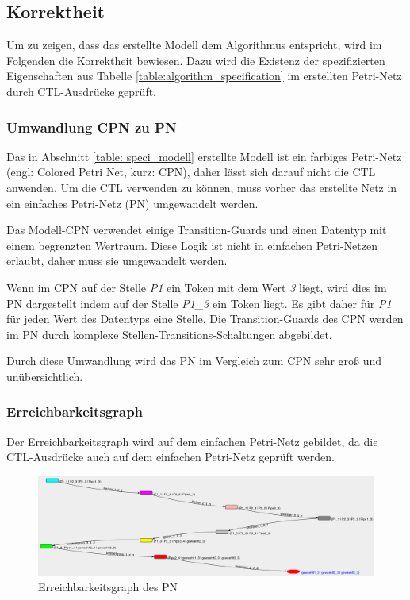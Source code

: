 \subsection{Korrektheit}
Um zu zeigen, dass das erstellte Modell dem Algorithmus entspricht, wird im Folgenden die Korrektheit bewiesen. Dazu wird die Existenz der spezifizierten Eigenschaften aus Tabelle \ref{table:algorithm_specification} im erstellten Petri-Netz durch CTL-Ausdrücke geprüft.

\subsubsection{Umwandlung CPN zu PN}
Das in Abschnitt \ref{table: speci_modell} erstellte Modell ist ein farbiges Petri-Netz (engl: Colored Petri Net, kurz: CPN), daher lässt sich darauf nicht die CTL anwenden. Um die CTL verwenden zu können, muss vorher das erstellte Netz in ein einfaches Petri-Netz (PN) umgewandelt werden.

Das Modell-CPN verwendet einige Transition-Guards und einen Datentyp mit einem begrenzten Wertraum. Diese Logik ist nicht in einfachen Petri-Netzen erlaubt, daher muss sie umgewandelt werden.

Wenn im CPN auf der Stelle \textit{P1} ein Token mit dem Wert \textit{3} liegt, wird dies im PN dargestellt indem auf der Stelle \textit{P1\_3} ein Token liegt. Es gibt daher für \textit{P1} für jeden Wert des Datentyps eine Stelle. Die Transition-Guards des CPN werden im PN durch komplexe Stellen-Transitions-Schaltungen abgebildet.

Durch diese Umwandlung wird das PN im Vergleich zum CPN sehr groß und unübersichtlich.

\subsubsection{Erreichbarkeitsgraph}
Der Erreichbarkeitsgraph wird auf dem einfachen Petri-Netz gebildet, da die CTL-Ausdrücke auch auf dem einfachen Petri-Netz geprüft werden.

\begin{figure}[H]
\centering
\includegraphics[width=1\linewidth]{img/reachibility_graph}
\caption{Erreichbarkeitsgraph des PN}
\label{fig:reachibility_graph}
\end{figure}

